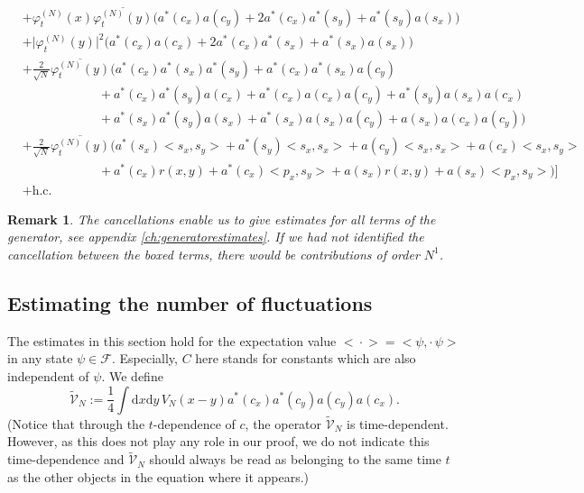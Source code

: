 \documentclass[11pt,a4paper,draft,DIV11]{scrartcl}	%
\newtheorem*{rem}{Remark}
\newcommand{\fock}{\mathcal{F}}		%
\newcommand{\di}{\textrm{d}}		%
\newcommand{\tilV}{\tilde{\mathcal{V}}_N}		%
\newcommand{\hc}{\mbox{h.c.}}		%
\newcommand{\scal}[2]{\big<#1,#2\big>} %
\newcommand{\cc}[1]{\overline{#1}}	%
\newcommand{\ev}[1]{\big<#1\big>}	%
\newcommand{\ph}{\varphi_t^{(N)}}	%
\newcommand{\bd}{\begin{displaymath}}			%
\newcommand{\ed}{\end{displaymath}}
\begin{document}
\begin{align}
& + \ph(x) \cc{\ph(y)} \Big( a^*(c_x) a(c_y) + 2 a^*(c_x) a^*(s_y) + a^*(s_y) a(s_x) \Big) \label{l19}\\
& + \lvert \ph(y) \rvert^2 \Big( a^*(c_x) a(c_x) + 2 a^*(c_x) a^*(s_x) + a^*(s_x) a(s_x) \Big) \label{l20}\\
& + \frac{2}{\sqrt{N}}\cc{\ph(y)} \bigg(    a^*(c_x) a^*(s_x) a^*(s_y) + a^*(c_x) a^*(s_x) a(c_y) \label{l21}\\
					    & \qquad\qquad\qquad + a^*(c_x) a^*(s_y) a(c_x) + a^*(c_x) a(c_x) a(c_y) + a^*(s_y) a(s_x) a(c_x) \label{l22}\\
					    & \qquad\qquad\qquad + a^*(s_x) a^*(s_y) a(s_x) + a^*(s_x) a(s_x) a(c_y) + a(s_x) a(c_x) a(c_y)  \bigg) \label{l23}\\
& + \frac{2}{\sqrt{N}}\cc{\ph(y)} \bigg(    a^*(s_x) \scal{s_x}{s_y} + a^*(s_y) \scal{s_x}{s_x}  + a(c_y) \scal{s_x}{s_x} + 							a(c_x) \scal{s_x}{s_y} \label{l24}\\
					    & \qquad\qquad\qquad + a^*(c_x)r(x,y) + a^*(c_x)\scal{p_x}{s_y} + a(s_x)r(x,y) + 			a(s_x)\scal{p_x}{s_y}		\bigg)    \Big] \label{l25}\\
&+ \hc \nonumber
\end{align}

\begin{rem}The cancellations enable us to give estimates for all terms of the generator, see appendix \ref{ch:generatorestimates}. If we had not identified the cancellation between the boxed terms, there would be contributions of order $N^1$.
\end{rem}


\subsection{Estimating the number of fluctuations}
\label{ss:number}
The estimates in this section hold for the expectation value $\ev{\cdot} =
\scal{\psi}{\cdot\,\psi}$ in any state $\psi \in \fock$. Especially, $C$ here stands for constants which are also independent of $\psi$. 
We define
\bd
\tilV := \frac{1}{4} \int \di x\di y\, V_N(x-y) a^\ast(c_x) a^\ast(c_y)a(c_y)a(c_x).
\ed
(Notice that through the $t$-dependence of $c$, the operator $\tilV$ is time-dependent. However, as this does not play any role in our proof, we do not indicate this time-dependence and $\tilV$ should always be read as belonging to the same time $t$ as the other objects in the equation where it appears.)
\end{document}

